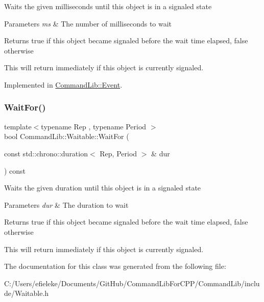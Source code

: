 Waits the given milliseconds until this object is in a signaled state


\begin{DoxyParams}{Parameters}
{\em ms} & The number of milliseconds to wait\\
\hline
\end{DoxyParams}
\begin{DoxyReturn}{Returns}
true if this object became signaled before the wait time elapsed, false otherwise
\end{DoxyReturn}


This will return immediately if this object is currently signaled. 

Implemented in \mbox{\hyperlink{class_command_lib_1_1_event_a395777fd83828fea3d225b2c192d70dd}{Command\+Lib\+::\+Event}}.

\mbox{\label{class_command_lib_1_1_waitable_a798d6d18990d625773e0565acaa89fe3}} 
\subsubsection{\texorpdfstring{Wait\+For()}{WaitFor()}}
{\footnotesize\ttfamily template$<$typename Rep , typename Period $>$ \\
bool Command\+Lib\+::\+Waitable\+::\+Wait\+For (\begin{DoxyParamCaption}\item[{const std\+::chrono\+::duration$<$ Rep, Period $>$ \&}]{dur }\end{DoxyParamCaption}) const\hspace{0.3cm}{\ttfamily [inline]}}



Waits the given duration until this object is in a signaled state


\begin{DoxyParams}{Parameters}
{\em dur} & The duration to wait\\
\hline
\end{DoxyParams}
\begin{DoxyReturn}{Returns}
true if this object became signaled before the wait time elapsed, false otherwise
\end{DoxyReturn}


This will return immediately if this object is currently signaled. 

The documentation for this class was generated from the following file\+:\begin{DoxyCompactItemize}
\item 
C\+:/\+Users/efieleke/\+Documents/\+Git\+Hub/\+Command\+Lib\+For\+C\+P\+P/\+Command\+Lib/include/Waitable.\+h\end{DoxyCompactItemize}
